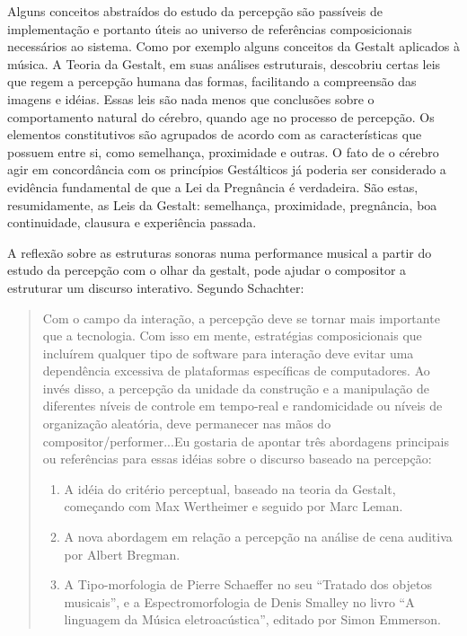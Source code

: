\documentclass{ppgmus}
\begin{document}




Alguns conceitos abstraídos do estudo da percepção são passíveis de implementação e portanto úteis 
ao universo de referências composicionais necessários ao sistema. Como por exemplo 
alguns conceitos da Gestalt aplicados à música. A Teoria da Gestalt, em suas análises estruturais, 
descobriu certas leis que regem a
percepção humana das formas, facilitando a compreensão das imagens e idéias. Essas leis são
nada menos que conclusões sobre o comportamento natural do cérebro, quando age no
processo de percepção. Os elementos constitutivos são agrupados de acordo com as
características que possuem entre si, como semelhança, proximidade e outras. O fato de o cérebro agir 
em concordância com os princípios Gestálticos já poderia ser
considerado a evidência fundamental de que a Lei da Pregnância é verdadeira. São estas,
resumidamente, as Leis da Gestalt: semelhança, proximidade, pregnância, boa continuidade, clausura e 
experiência passada.


A reflexão sobre as estruturas sonoras numa performance musical a partir do estudo
da percepção com o olhar da gestalt, pode ajudar o compositor a estruturar um 
discurso interativo. Segundo Schachter:
\begin{quote}
 Com o campo da interação, a percepção deve se tornar mais importante que a tecnologia.
Com isso em mente, estratégias composicionais que incluírem qualquer tipo de software
 para interação deve evitar uma dependência excessiva de plataformas específicas de 
computadores. Ao invés disso, a percepção da unidade da construção e a manipulação de
diferentes níveis de controle em tempo-real e randomicidade ou níveis de organização
aleatória, deve permanecer nas mãos do compositor/performer...Eu gostaria de apontar
três abordagens principais ou referências para essas idéias sobre o discurso baseado
na percepção:
\begin{enumerate}
  \item A idéia do critério perceptual, baseado na teoria da Gestalt, começando com
Max Wertheimer e seguido por Marc Leman.
  \item A nova abordagem em relação a percepção na análise de cena auditiva por Albert
Bregman.
  \item A Tipo-morfologia de Pierre Schaeffer no seu ``Tratado dos objetos musicais'',
e a Espectromorfologia de Denis Smalley no livro ``A linguagem da Música eletroacústica'', editado
por Simon Emmerson.
\cite{schachter07:discourse}
\end{enumerate}
\end{quote} 
\end{document}
